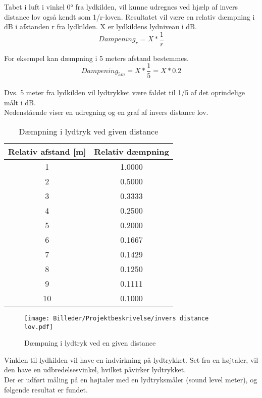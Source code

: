 Tabet i luft i vinkel 0° fra lydkilden, vil kunne udregnes ved hjælp af invers distance lov også kendt som 1/r-loven. Resultatet vil være en relativ dæmpning i dB i afstanden r fra lydkilden. X er lydkildens lydniveau i dB.
\begin{equation}
Dampening_r = X*\frac{1}{r}
\end{equation}

For eksempel kan dæmpning i 5 meters afstand bestemmes.
\begin{equation}
Dampening_{5m} = X*\frac{1}{5}=X*0.2
\end{equation}
\pagebreak\\

Dvs. 5 meter fra lydkilden vil lydtrykket være faldet til 1/5 af det oprindelige målt i dB.\\
Nedenstående viser en udregning og en graf af invers distance lov.\\

\begin{table}[H]
	\centering
		\begin{tabular}{|c|c|}
			\hline
			Relativ afstand [m] & Relativ dæmpning \\ \hline
			1 & 1.0000\\ \hline
			2 & 0.5000\\ \hline
			3 & 0.3333\\ \hline
			4 & 0.2500\\ \hline
			5 & 0.2000\\ \hline
			6 & 0.1667\\ \hline
			7 & 0.1429\\ \hline
			8 & 0.1250\\ \hline
			9 & 0.1111\\ \hline
			10 & 0.1000\\ \hline
		\end{tabular}
	\caption{Dæmpning i lydtryk ved given distance}
	\label{tab:lydtryk vs distance}
\end{table}

\begin{figure}[h!]
  \centering
    \texttt{[image: Billeder/Projektbeskrivelse/invers distance lov.pdf]}
    \caption{Dæmpning i lydtryk ved en given distance}
\end{figure}\medskip

Vinklen til lydkilden vil have en indvirkning på lydtrykket. Set fra en højtaler, vil den have en udbredelsesvinkel, hvilket påvirker lydtrykket.\\
Der er udført måling på en højtaler med en lydtryksmåler (sound level meter), og følgende resultat er fundet.

